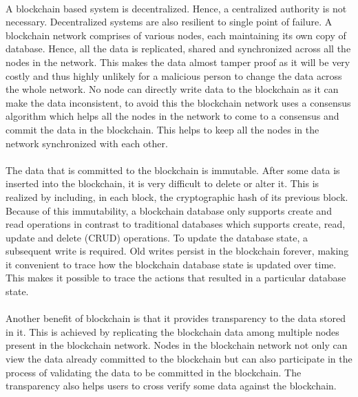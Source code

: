 \documentclass{article}
\begin{document}
        \paragraph{}
        A blockchain based system is decentralized. Hence, a centralized authority is not necessary. Decentralized systems are also resilient to single point of failure. A blockchain network comprises of various nodes, each maintaining its own copy of database. Hence, all the data is replicated, shared and synchronized across all the nodes in the network. This makes the data almost tamper proof as it will be very costly and thus highly unlikely for a malicious person to change the data across the whole network. No node can directly write data to the blockchain as it can make the data inconsistent, to avoid this the blockchain network uses a consensus algorithm which helps all the nodes in the network to come to a consensus and commit the data in the blockchain. This helps to keep all the nodes in the network synchronized with each other. 

        \paragraph{}
        The data that is committed to the blockchain is immutable. After some data is inserted into the blockchain, it is very difficult to delete or alter it. This is realized by including, in each block, the cryptographic hash of its previous block. Because of this immutability, a blockchain database only supports create and read operations in contrast to traditional databases which supports create, read, update and delete (CRUD) operations. To update the database state, a subsequent write is required. Old writes persist in the blockchain forever, making it convenient to trace how the blockchain database state is updated over time. This makes it possible to trace the actions that resulted in a particular database state.

        \paragraph{}
        Another benefit of blockchain is that it provides transparency to the data stored in it. This is achieved by replicating the blockchain data among multiple nodes present in the blockchain network. Nodes in the blockchain network not only can view the data already committed to the blockchain but can also participate in the process of validating the data to be committed in the blockchain. The transparency also helps users to cross verify some data against the blockchain.  
\end{document}
